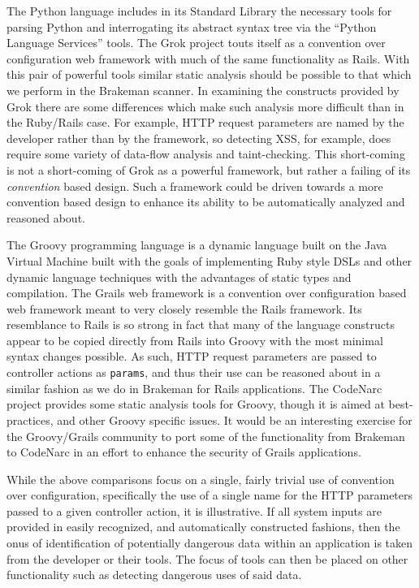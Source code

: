 \documentclass[conference]{IEEEtran}
\begin{document}
The Python language includes in its Standard Library the necessary tools for
parsing Python and interrogating its abstract syntax tree via the ``Python
Language Services''\cite{python_language_services} tools.  The Grok\cite{grok}
project touts itself as a convention over configuration web framework with much
of the same functionality as Rails.  With this pair of powerful tools similar
static analysis should be possible to that which we perform in the Brakeman
scanner.  In examining the constructs provided by Grok there are some
differences which make such analysis more difficult than in the Ruby/Rails case.
For example, HTTP request parameters are named by the developer rather than by
the framework, so detecting XSS, for example, does require some variety of
data-flow analysis and taint-checking.  This short-coming is not a short-coming
of Grok as a powerful framework, but rather a failing of its \emph{convention}
based design.  Such a framework could be driven towards a more convention based
design to enhance its ability to be automatically analyzed and reasoned about.

The Groovy\cite{groovy} programming language is a dynamic language built on the
Java Virtual Machine built with the goals of implementing Ruby style DSLs and
other dynamic language techniques with the advantages of static types and
compilation.  The Grails\cite{grails} web framework is a convention over
configuration based web framework meant to very closely resemble the Rails
framework.  Its resemblance to Rails is so strong in fact that many of the
language constructs appear to be copied directly from Rails into Groovy with the
most minimal syntax changes possible.  As such, HTTP request
parameters are passed to controller actions as \texttt{params}, and thus their
use can be reasoned about in a similar fashion as we do in Brakeman for Rails
applications.  The CodeNarc\cite{codenarc} project provides some static analysis
tools for Groovy, though it is aimed at best-practices, and other Groovy
specific issues.  It would be an interesting exercise for the Groovy/Grails
community to port some of the functionality from Brakeman to CodeNarc in an
effort to enhance the security of Grails applications.

While the above comparisons focus on a single, fairly trivial use of convention
over configuration, specifically the use of a single name for the HTTP
parameters passed to a given controller action, it is illustrative.  If all
system inputs are provided in easily recognized, and automatically constructed
fashions, then the onus of identification of potentially dangerous data within
an application is taken from the developer or their tools.  The focus of tools
can then be placed on other functionality such as detecting dangerous uses of
said data.
\end{document}
